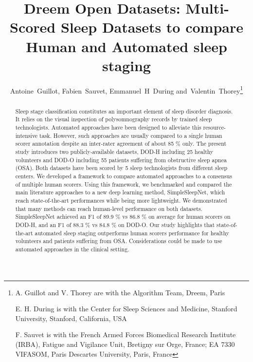 \documentclass[journal]{IEEEtran}
\begin{document}
\title{Dreem Open Datasets: Multi-Scored Sleep Datasets to compare Human and Automated sleep staging}


\author{Antoine~Guillot, Fabien~Sauvet, Emmanuel~H~During and~Valentin~Thorey\thanks{A. Guillot and V. Thorey are with the Algorithm Team, Dreem, Paris

E. H. During is with the Center for Sleep Sciences and Medicine, Stanford University, Stanford, California, USA

F. Sauvet is with the French Armed Forces Biomedical Research Institute (IRBA), Fatigue and Vigilance Unit, Bretigny sur Orge, France; EA 7330 VIFASOM, Paris Descartes University, Paris, France
}}




















\maketitle

\begin{abstract}
Sleep stage classification constitutes an important element of sleep disorder diagnosis. It relies on the visual inspection of polysomnography records by trained sleep technologists. Automated approaches have been designed to alleviate this resource-intensive task. However, such approaches are usually compared to a single human scorer annotation despite an inter-rater agreement of about 85 \% only. The present study introduces two publicly-available datasets, DOD-H including 25 healthy volunteers and DOD-O including 55 patients suffering from obstructive sleep apnea (OSA). Both datasets have been scored by 5 sleep technologists from different sleep centers. We developed a framework to compare automated approaches to a consensus of multiple human scorers. Using this framework, we benchmarked and compared the main literature approaches to a new deep learning method, SimpleSleepNet, which reach state-of-the-art performances while being more lightweight. We demonstrated that many methods can reach human-level performance on both datasets. SimpleSleepNet achieved an F1 of 89.9 \% vs 86.8 \% on average for human scorers on DOD-H, and an F1 of 88.3 \% vs 84.8 \%  on DOD-O. Our study highlights that state-of-the-art automated sleep staging outperforms human scorers performance for healthy volunteers and patients suffering from OSA. Considerations could be made to use automated approaches in the clinical setting.


\end{abstract}
 
\end{document}
